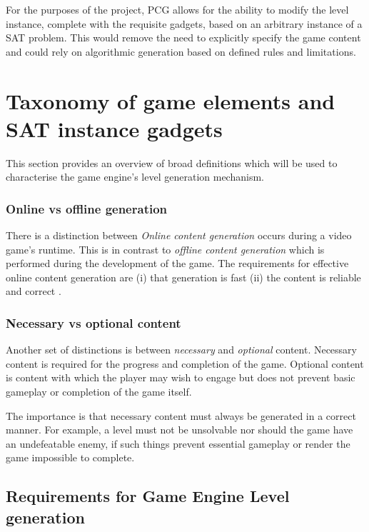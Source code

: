 \documentclass[11pt, a4paper, oneside]{report} %
\begin{document}
For the purposes of the project, PCG allows for the ability to modify the level
instance, complete with the requisite gadgets, based on an arbitrary instance of
a SAT problem. This would remove the need to explicitly specify the game content
and could rely on algorithmic generation based on defined rules and limitations.

\section{Taxonomy of game elements and SAT instance gadgets}

This section provides an overview of broad definitions which will be used to
characterise the game engine's level generation mechanism.

\subsubsection{Online vs offline generation}

There is a distinction between \textit{Online content generation} occurs during
a video game's runtime. This is in contrast to \textit{offline content
generation} which is performed during the development of the game. The
requirements for effective online content generation are (i) that generation is
fast (ii) the content is reliable and correct \cite{5756645}.

\subsubsection{Necessary vs optional content}

Another set of distinctions is between \textit{necessary} and \textit{optional}
content. Necessary content is required for the progress and completion of the
game. Optional content is content with which the player may wish to engage but
does not prevent basic gameplay or completion of the game itself.

The importance is that necessary content must always be generated in a correct
manner. For example, a level must not be unsolvable nor should the game have an
undefeatable enemy, if such things prevent essential gameplay or render the game
impossible to complete.

\subsection{Requirements for Game Engine Level generation}
\end{document}
